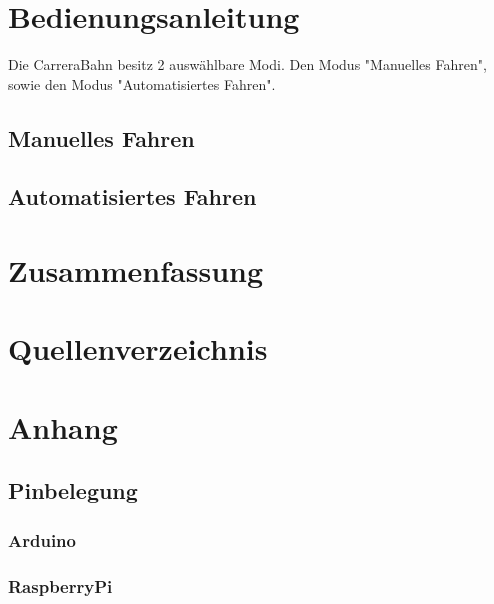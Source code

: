 \documentclass[a4paper, 11pt]{scrartcl}
\begin{document}
	\newpage

\section{Bedienungsanleitung}
Die CarreraBahn besitz 2 auswählbare Modi. Den Modus "Manuelles Fahren", sowie den Modus "Automatisiertes Fahren".
\subsection{Manuelles Fahren}

\subsection{Automatisiertes Fahren}
\newpage

\section{Zusammenfassung}
\newpage

\section{Quellenverzeichnis}
\newpage

\section{Anhang}
\subsection{Pinbelegung}
\subsubsection{Arduino}
\subsubsection{RaspberryPi}
\end{document}
